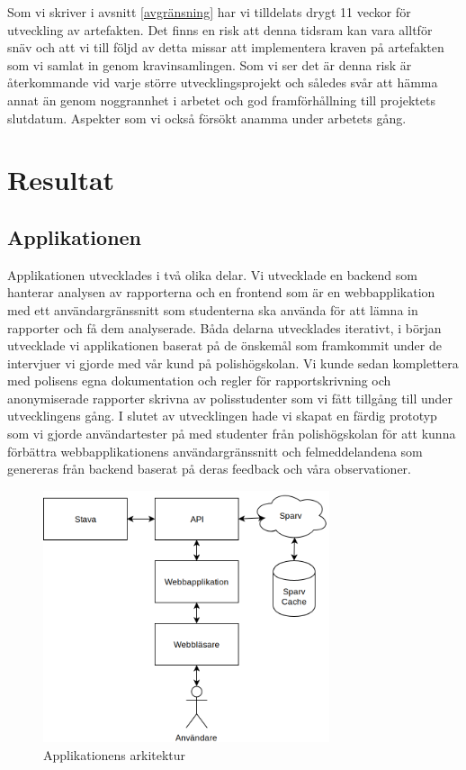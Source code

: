 \documentclass[swedish]{maucsthesis}
\begin{document}
Som vi skriver i avsnitt \ref{avgränsning} har vi tilldelats drygt 11 veckor
för utveckling av artefakten. Det finns en risk att denna tidsram kan vara
alltför snäv och att vi till följd av detta missar att implementera kraven på
artefakten som vi samlat in genom kravinsamlingen. Som vi ser det är denna risk
är återkommande vid varje större utvecklingsprojekt och således svår att hämma
annat än genom noggrannhet i arbetet och god framförhållning till projektets
slutdatum. Aspekter som vi också försökt anamma under arbetets gång.


\section{Resultat}
\subsection{Applikationen}\label{applikationen}

Applikationen utvecklades i två olika delar. Vi utvecklade en backend som
hanterar analysen av rapporterna och en frontend som är en webbapplikation med
ett användargränssnitt som studenterna ska använda för att lämna in rapporter
och få dem analyserade. Båda delarna utvecklades iterativt, i början utvecklade
vi applikationen baserat på de önskemål som framkommit under de intervjuer vi
gjorde med vår kund på polishögskolan. Vi kunde sedan komplettera med polisens
egna dokumentation och regler för rapportskrivning och anonymiserade rapporter
skrivna av polisstudenter som vi fått tillgång till under utvecklingens gång. I
slutet av utvecklingen hade vi skapat en färdig prototyp som vi gjorde
användartester på med studenter från polishögskolan för att kunna förbättra
webbapplikationens användargränssnitt och felmeddelandena som genereras från
backend baserat på deras feedback och våra observationer.

\begin{figure}[H]
    \centering
    \includegraphics[width=0.75\textwidth]{architecture.png}
    \caption{Applikationens arkitektur}
    \label{fig:architecture}
\end{figure}
\end{document}
